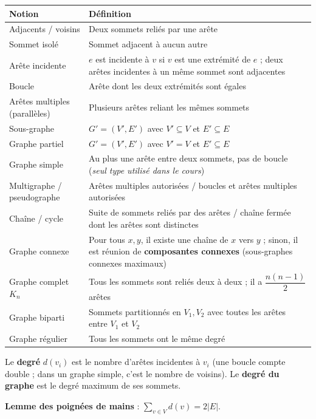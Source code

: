 \documentclass[11pt,a4paper]{article}
\begin{document}
\begin{center}
\small
\begin{tabular}{@{}p{3.6cm}p{11.8cm}@{}}
\toprule
\textbf{Notion} & \textbf{Définition}\\
\midrule
Adjacents / voisins & Deux sommets reliés par une arête\\
Sommet isolé & Sommet adjacent à aucun autre\\
Arête incidente & $e$ est incidente à $v$ si $v$ est une extrémité de $e$ ; deux arêtes incidentes à un même sommet sont adjacentes\\
Boucle & Arête dont les deux extrémités sont égales\\
Arêtes multiples (parallèles) & Plusieurs arêtes reliant les mêmes sommets\\
Sous-graphe & $G'=(V',E')$ avec $V'\subseteq V$ et $E'\subseteq E$\\
Graphe partiel & $G'=(V',E')$ avec $V'=V$ et $E'\subseteq E$\\
Graphe simple & Au plus une arête entre deux sommets, pas de boucle (\emph{seul type utilisé dans le cours})\\
Multigraphe / pseudographe & Arêtes multiples autorisées / boucles et arêtes multiples autorisées\\
Chaîne / cycle & Suite de sommets reliés par des arêtes / chaîne fermée dont les arêtes sont distinctes\\
Graphe connexe & Pour tous $x,y$, il existe une chaîne de $x$ vers $y$ ; sinon, il est réunion de \textbf{composantes connexes} (sous-graphes connexes maximaux)\\
Graphe complet $K_n$ & Tous les sommets sont reliés deux à deux ; il a $\dfrac{n(n-1)}{2}$ arêtes\\
Graphe biparti & Sommets partitionnés en $V_1,V_2$ avec toutes les arêtes entre $V_1$ et $V_2$\\
Graphe régulier & Tous les sommets ont le même degré\\
\bottomrule
\end{tabular}
\end{center}

\begin{retenir}[degré]
Le \textbf{degré} $d(v_i)$ est le nombre d'arêtes incidentes à $v_i$ (une boucle compte double ; dans un graphe simple, c'est le nombre de voisins). Le \textbf{degré du graphe} est le degré maximum de ses sommets.

\textbf{Lemme des poignées de mains} : $\displaystyle\sum_{v\in V}d(v)=2|E|$.
\end{retenir}
\end{document}
